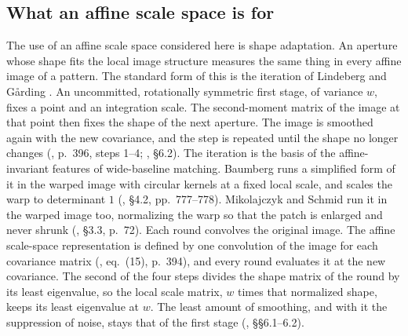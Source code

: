 \subsection{What an affine scale space is for}\label{sec:landscape-uses}

The use of an affine scale space considered here is shape adaptation. An aperture whose shape
fits the local image structure measures the same thing in every affine image of a pattern. The
standard form of this is the iteration of Lindeberg and G\aa{}rding . An
uncommitted, rotationally symmetric first stage, of variance $w$, fixes a point and an integration
scale.
The second-moment matrix of the image at that point then fixes the shape of the next aperture. The
image is smoothed again with the new covariance, and the step is repeated until the shape no longer
changes (, p.~396, steps 1--4; , \S6.2). The
iteration is the basis of the affine-invariant features of wide-baseline matching. Baumberg runs a
simplified form of it in the warped image with circular kernels at a fixed local scale, and scales
the warp to determinant $1$ (, \S4.2, pp.~777--778). Mikolajczyk and
Schmid run it in the warped image too, normalizing the warp so that the patch is enlarged and never
shrunk (, \S3.3, p.~72).
Each round convolves the original image. The affine scale-space representation is defined by one
convolution of the image for each covariance matrix (, eq.~(15), p.~394),
and every round evaluates it at the new covariance. The second of the four steps divides the shape
matrix of the round by its least eigenvalue, so the local scale matrix, $w$ times that normalized
shape, keeps its least eigenvalue at $w$. The least amount of smoothing, and with it the suppression of noise, stays that of
the first stage (, \S\S6.1--6.2).

